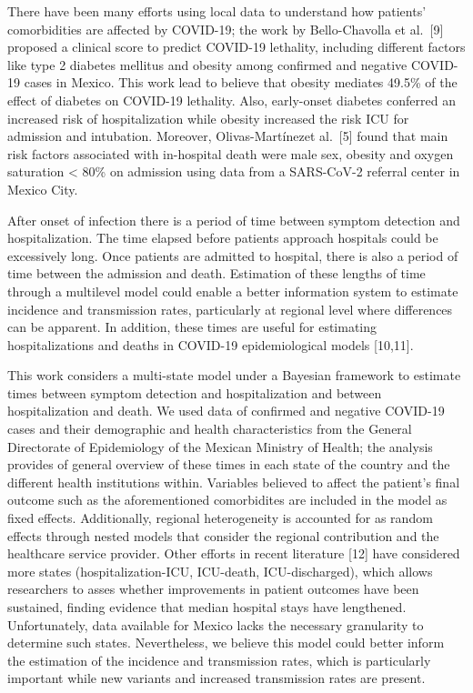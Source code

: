 \documentclass[10pt,letterpaper]{article}
\begin{document}
There have been many efforts using local data to understand how
patients' comorbidities are affected by COVID-19; the work by
Bello-Chavolla et al.~{[}9{]} proposed a clinical score to predict
COVID-19 lethality, including different factors like type 2 diabetes
mellitus and obesity among confirmed and negative COVID-19 cases in
Mexico. This work lead to believe that obesity mediates 49.5\% of the
effect of diabetes on COVID-19 lethality. Also, early-onset diabetes
conferred an increased risk of hospitalization while obesity increased
the risk ICU for admission and intubation. Moreover,
Olivas-Mart\'{i}nezet al.~{[}5{]} found that main risk factors
associated with in-hospital death were male sex, obesity and oxygen
saturation \textless{} 80\% on admission using data from a SARS-CoV-2
referral center in Mexico City.

After onset of infection there is a period of time between symptom
detection and hospitalization. The time elapsed before patients approach
hospitals could be excessively long. Once patients are admitted to
hospital, there is also a period of time between the admission and
death. Estimation of these lengths of time through a multilevel model
could enable a better information system to estimate incidence and
transmission rates, particularly at regional level where differences can
be apparent. In addition, these times are useful for estimating
hospitalizations and deaths in COVID-19 epidemiological models
{[}10,11{]}.

This work considers a multi-state model under a Bayesian framework to
estimate times between symptom detection and hospitalization and between
hospitalization and death. We used data of confirmed and negative
COVID-19 cases and their demographic and health characteristics from the
General Directorate of Epidemiology of the Mexican Ministry of Health;
the analysis provides of general overview of these times in each state
of the country and the different health institutions within. Variables
believed to affect the patient's final outcome such as the
aforementioned comorbidites are included in the model as fixed effects.
Additionally, regional heterogeneity is accounted for as random effects
through nested models that consider the regional contribution and the
healthcare service provider. Other efforts in recent literature {[}12{]}
have considered more states (hospitalization-ICU, ICU-death,
ICU-discharged), which allows researchers to asses whether improvements
in patient outcomes have been sustained, finding evidence that median
hospital stays have lengthened. Unfortunately, data available for Mexico
lacks the necessary granularity to determine such states. Nevertheless,
we believe this model could better inform the estimation of the
incidence and transmission rates, which is particularly important while
new variants and increased transmission rates are present.
\end{document}
